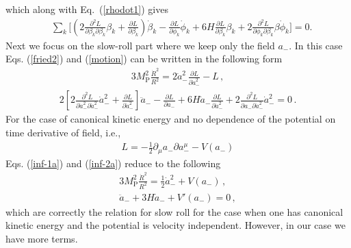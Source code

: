 \documentclass[a4paper,11pt]{article}
\def\non{\nonumber\\}
\def\non{\nonumber\\}
\begin{document}
  which along with Eq.~(\ref{rhodot1}) gives
  \begin{align}
    &\sum_{k}\Big[ \left(2 \frac{\partial^2 L}{\partial \beta_k \partial \beta_k} \beta_k + \frac{\partial L}{\partial \beta_k}
    \right)\dot \beta_k
    - \frac{\partial L}{\partial \phi_k} \dot \phi_k + 6H \frac{\partial L}{\partial \beta_k} \beta_k
    + 2 \frac{\partial^2 L}{\partial \phi_k\partial \beta_k} \beta\dot \phi_k \Big]=0.
    \label{motion}
  \end{align}
  Next we focus on the slow-roll part where we keep only the field $a_-$. In this case Eqs. (\ref{fried2}) and (\ref{motion}) can be written in
  the following form
  \begin{align}
    3 M_\text{P}^2 \frac{\dot R^2}{R^2} = 2 \dot a_{-}^2 \frac{\partial L}{\partial \dot a_{-}^2} - L\,,
    \label{inf-1a}
  \end{align}
  \begin{align}
    2 \left[2 \frac{\partial^2 L}{\partial \dot a_{-}^2 \partial \dot a_{-}^2} \dot a_{-}^2 + \frac{\partial L}{\partial \dot a_{-}^2}
    \right] \ddot a_{-} -
    \frac{\partial L}{\partial a_{-}} + 6H \dot a_{-} \frac{\partial L}{\partial \dot a_{-}^2}
    + 2 \frac{\partial^2 L}{\partial a_{-} \partial \dot a_{-}^2} \dot a_{-}^2
    =0
    \label{inf-2a}\,.
  \end{align}
  For the case of canonical kinetic energy and no dependence of the potential on time derivative of field, i.e.,
  \begin{align}
    L= -\frac{1}{2} \partial_\mu a_{-}\partial a_{-}^{\mu} - V(a_-)
  \end{align}
  Eqs. (\ref{inf-1a}) and  (\ref{inf-2a}) 
   reduce to the following
  \begin{align}
    3 M_\text{P}^2 \frac{\dot R^2}{R^2} = \frac{1}{2} \dot a_{-}^2 + V(a_-)\,,\non
    \ddot a_{-} + 3 H \dot a_{-} + V'(a_{-})=0\,,
  \end{align}
  which are correctly the relation for slow roll for the case when one has canonical kinetic energy and the potential
  is velocity independent. However, in our case we have more terms.

\end{document}
